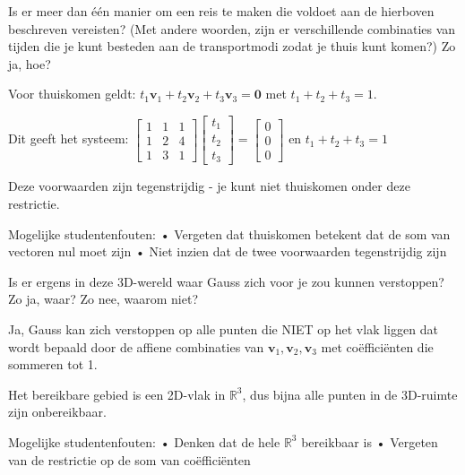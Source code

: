 \documentclass{ximera}
\begin{document}
\begin{question}
Is er meer dan één manier om een reis te maken die voldoet aan de hierboven beschreven vereisten? (Met andere woorden, zijn er verschillende combinaties van tijden die je kunt besteden aan de transportmodi zodat je thuis kunt komen?) Zo ja, hoe?

\begin{freeResponse}
Voor thuiskomen geldt: $t_1\mathbf{v}_1 + t_2\mathbf{v}_2 + t_3\mathbf{v}_3 = \mathbf{0}$ met $t_1 + t_2 + t_3 = 1$.

Dit geeft het systeem:
$\begin{bmatrix} 1 & 1 & 1 \\ 1 & 2 & 4 \\ 1 & 3 & 1 \end{bmatrix} \begin{bmatrix} t_1 \\ t_2 \\ t_3 \end{bmatrix} = \begin{bmatrix} 0 \\ 0 \\ 0 \end{bmatrix}$ en $t_1 + t_2 + t_3 = 1$

Deze voorwaarden zijn tegenstrijdig - je kunt niet thuiskomen onder deze restrictie.

Mogelijke studentenfouten:
• Vergeten dat thuiskomen betekent dat de som van vectoren nul moet zijn
• Niet inzien dat de twee voorwaarden tegenstrijdig zijn
\end{freeResponse}
\end{question}

\begin{question}
Is er ergens in deze 3D-wereld waar Gauss zich voor je zou kunnen verstoppen? Zo ja, waar? Zo nee, waarom niet?

\begin{freeResponse}
Ja, Gauss kan zich verstoppen op alle punten die NIET op het vlak liggen dat wordt bepaald door de affiene combinaties van $\mathbf{v}_1, \mathbf{v}_2, \mathbf{v}_3$ met coëfficiënten die sommeren tot 1.

Het bereikbare gebied is een 2D-vlak in $\mathbb{R}^3$, dus bijna alle punten in de 3D-ruimte zijn onbereikbaar.

Mogelijke studentenfouten:
• Denken dat de hele $\mathbb{R}^3$ bereikbaar is
• Vergeten van de restrictie op de som van coëfficiënten
\end{freeResponse}
\end{question}
\end{document}
